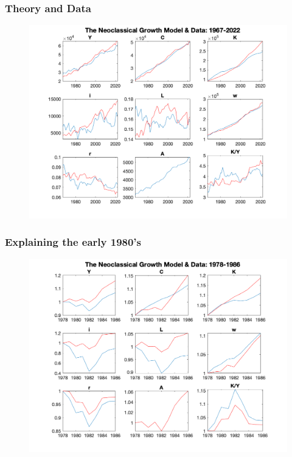 \documentclass{beamer}
\begin{document}
\begin{frame}
\frametitle[alignment=center]{Theory and Data}
\begin{figure}
\centering
\includegraphics[scale=0.5]{Figures/Figure_7.png}
\end{figure}
 
\end{frame}

\begin{frame}
\frametitle[alignment=center]{Explaining the early 1980's}
\begin{figure}
\centering
\includegraphics[scale=0.5]{Figures/Figure_8.png}
\end{figure}
\end{frame}
\end{document}
